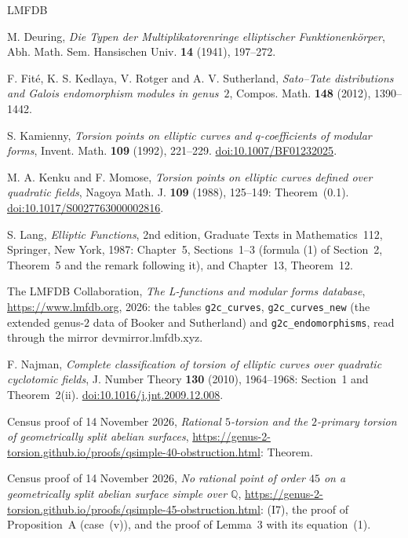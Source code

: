 \documentclass[11pt]{article}
\newcommand{\Q}{\mathbb Q}
\begin{document}
\begin{thebibliography}{LMFDB}

M. Deuring, \emph{Die Typen der Multiplikatorenringe elliptischer Funktionenk\"orper}, Abh. Math. Sem. Hansischen
Univ. \textbf{14} (1941), 197--272.

F. Fit\'e, K. S. Kedlaya, V. Rotger and A. V. Sutherland, \emph{Sato--Tate distributions and Galois endomorphism
modules in genus~\(2\)}, Compos. Math. \textbf{148} (2012), 1390--1442.

S. Kamienny, \emph{Torsion points on elliptic curves and \(q\)-coefficients of modular forms}, Invent. Math.
\textbf{109} (1992), 221--229.
\href{https://doi.org/10.1007/BF01232025}{doi:10.1007/BF01232025}.

M. A. Kenku and F. Momose, \emph{Torsion points on elliptic curves defined over quadratic fields}, Nagoya Math. J.
\textbf{109} (1988), 125--149: Theorem~(0.1).
\href{https://doi.org/10.1017/S0027763000002816}{doi:10.1017/S0027763000002816}.

S. Lang, \emph{Elliptic Functions}, 2nd edition, Graduate Texts in Mathematics~112, Springer, New York, 1987:
Chapter~5, Sections~1--3 (formula (1) of Section~2, Theorem~5 and the remark following it), and Chapter~13,
Theorem~12.

The LMFDB Collaboration, \emph{The L-functions and modular forms database}, \url{https://www.lmfdb.org}, 2026: the
tables \texttt{g2c\_curves}, \texttt{g2c\_curves\_new} (the extended genus-\(2\) data of Booker and Sutherland) and
\texttt{g2c\_endomorphisms}, read through the mirror devmirror.lmfdb.xyz.

F. Najman, \emph{Complete classification of torsion of elliptic curves over quadratic cyclotomic fields}, J. Number
Theory \textbf{130} (2010), 1964--1968: Section~1 and Theorem~2(ii).
\href{https://doi.org/10.1016/j.jnt.2009.12.008}{doi:10.1016/j.jnt.2009.12.008}.

Census proof of 14 November 2026, \emph{Rational \(5\)-torsion and the \(2\)-primary torsion of geometrically split
abelian surfaces}, \url{https://genus-2-torsion.github.io/proofs/qsimple-40-obstruction.html}: Theorem.

Census proof of 14 November 2026, \emph{No rational point of order \(45\) on a geometrically split abelian surface
simple over \(\Q\)}, \url{https://genus-2-torsion.github.io/proofs/qsimple-45-obstruction.html}: (I7), the proof
of Proposition~A (case~(v)), and the proof of Lemma~3 with its equation~(1).


\end{thebibliography}
\end{document}
